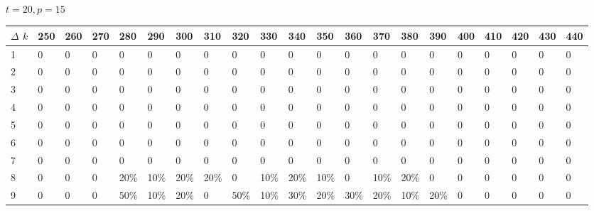 \documentclass[11pt]{article}
\begin{document}
\paragraph{}
$t =  20, p =  15$
\begin{center} \tiny \begin{tabular}{|l |l |l |l |l |l |l |l |l |l |l |l |l |l |l |l |l |l |l |l |l |} \hline
$\Delta$ $k$ &250 & 260 & 270 & 280 & 290 & 300 & 310 & 320 & 330 & 340 & 350 & 360 & 370 & 380 & 390 & 400 & 410 & 420 & 430 & 440  \\ \hline
1 & 0 & 0 & 0 & 0 & 0 & 0 & 0 & 0 & 0 & 0 & 0 & 0 & 0 & 0 & 0 & 0 & 0 & 0 & 0 & 0  \\ \hline
2 & 0 & 0 & 0 & 0 & 0 & 0 & 0 & 0 & 0 & 0 & 0 & 0 & 0 & 0 & 0 & 0 & 0 & 0 & 0 & 0  \\ \hline
3 & 0 & 0 & 0 & 0 & 0 & 0 & 0 & 0 & 0 & 0 & 0 & 0 & 0 & 0 & 0 & 0 & 0 & 0 & 0 & 0  \\ \hline
4 & 0 & 0 & 0 & 0 & 0 & 0 & 0 & 0 & 0 & 0 & 0 & 0 & 0 & 0 & 0 & 0 & 0 & 0 & 0 & 0  \\ \hline
5 & 0 & 0 & 0 & 0 & 0 & 0 & 0 & 0 & 0 & 0 & 0 & 0 & 0 & 0 & 0 & 0 & 0 & 0 & 0 & 0  \\ \hline
6 & 0 & 0 & 0 & 0 & 0 & 0 & 0 & 0 & 0 & 0 & 0 & 0 & 0 & 0 & 0 & 0 & 0 & 0 & 0 & 0  \\ \hline
7 & 0 & 0 & 0 & 0 & 0 & 0 & 0 & 0 & 0 & 0 & 0 & 0 & 0 & 0 & 0 & 0 & 0 & 0 & 0 & 0  \\ \hline
8 & 0 & 0 & 0 & 20\% & 10\% & 20\% & 20\% & 0 & 10\% & 20\% & 10\% & 0 & 10\% & 20\% & 0 & 0 & 0 & 0 & 0 & 0  \\ \hline
9 & 0 & 0 & 0 & 50\% & 10\% & 20\% & 0 & 50\% & 10\% & 30\% & 20\% & 30\% & 20\% & 10\% & 20\% & 0 & 0 & 0 & 0 & 0  \\ \hline
\end{tabular}\end{center}
\end{document}

